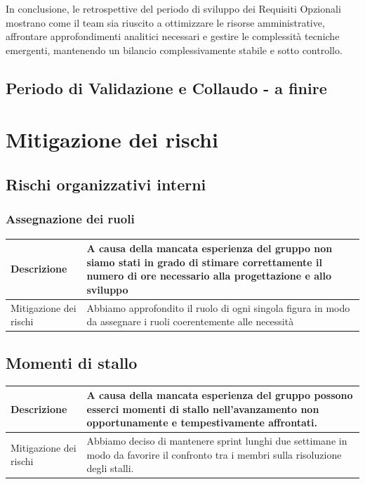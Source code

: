 \documentclass{article}
\begin{document}
In conclusione, le retrospettive del periodo di sviluppo dei Requisiti Opzionali mostrano come il team sia riuscito a ottimizzare le risorse amministrative, affrontare approfondimenti analitici necessari e gestire le complessità tecniche emergenti, mantenendo un bilancio complessivamente stabile e sotto controllo.


\subsection{Periodo di Validazione e Collaudo - a finire}

\newpage
\section{Mitigazione dei rischi}

\subsection{Rischi organizzativi interni}

\subsubsection{Assegnazione dei ruoli}
\begin{center}
\begin{tabular}{|P{10em}| P{20em}|} 
\hline
     Descrizione &  A causa della mancata esperienza del gruppo non siamo stati in grado di stimare correttamente il numero di ore necessario alla progettazione e allo sviluppo\\ 
     \hline
    Mitigazione dei rischi &  Abbiamo approfondito il ruolo di ogni singola figura in modo da assegnare i ruoli coerentemente alle necessità\\
    \hline
\end{tabular}
\label{tab:mitruoli}
\end{center}

\subsection{Momenti di stallo}
\begin{center}
\begin{tabular}{|P{10em}| P{20em}|} 
\hline
     Descrizione &  A causa della mancata esperienza del gruppo possono esserci momenti di stallo nell'avanzamento non opportunamente e tempestivamente affrontati.\\ 
     \hline
    Mitigazione dei rischi &  Abbiamo deciso di mantenere sprint lunghi due settimane in modo da favorire il confronto tra i membri sulla risoluzione degli stalli.\\
    \hline
\end{tabular}
\label{tab:mitruoli}
\end{center}
\end{document}
